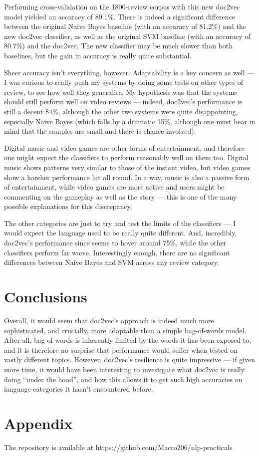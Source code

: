 \documentclass[12pt,a4paper,twoside]{article}
\begin{document}
Performing cross-validation on the 1800-review corpus with this new doc2vec model yielded an accuracy of 89.1\%. There is indeed a significant difference between the original Naive Bayes baseline (with an accuracy of 81.2\%) and the new doc2vec classifier, as well as the original SVM baseline (with an accuracy of 80.7\%) and the doc2vec. The new classifier may be much slower than both baselines, but the gain in accuracy is really quite substantial.

Sheer accuracy isn't everything, however. Adaptability is a key concern as well --- I was curious to really push my systems by doing some tests on other types of review, to see how well they generalise. My hypothesis was that the systems should still perform well on video reviews --- indeed, doc2vec's performance is still a decent 84\%, although the other two systems were quite disappointing, especially Naive Bayes (which falls by a dramatic 15\%, although one must bear in mind that the samples are small and there is chance involved).

Digital music and video games are other forms of entertainment, and therefore one might expect the classifiers to perform reasonably well on them too. Digital music shows patterns very similar to those of the instant video, but video games show a harsher performance hit all round. In a way, music is also a passive form of entertainment, while video games are more active and users might be commenting on the gameplay as well as the story --- this is one of the many possible explanations for this discrepancy.

The other categories are just to try and test the limits of the classifiers --- I would expect the language used to be really quite different. And, incredibly, doc2vec's performance since seems to hover around 75\%, while the other classifiers perform far worse. Interestingly enough, there are no significant differences between Naive Bayes and SVM across any review category.


\section{Conclusions}

Overall, it would seem that doc2vec's approach is indeed much more sophisticated, and crucially, more adaptable than a simple bag-of-words model. After all, bag-of-words is inherently limited by the words it has been exposed to, and it is therefore no surprise that performance would suffer when tested on vastly different topics. However, doc2vec's resilience is quite impressive --- if given more time, it would have been interesting to investigate what doc2vec is really doing ``under the hood'', and how this allows it to get such high accuracies on language categories it hasn't encountered before.

\section{Appendix}

The repository is available at https://github.com/Macro206/nlp-practicals
\end{document}
